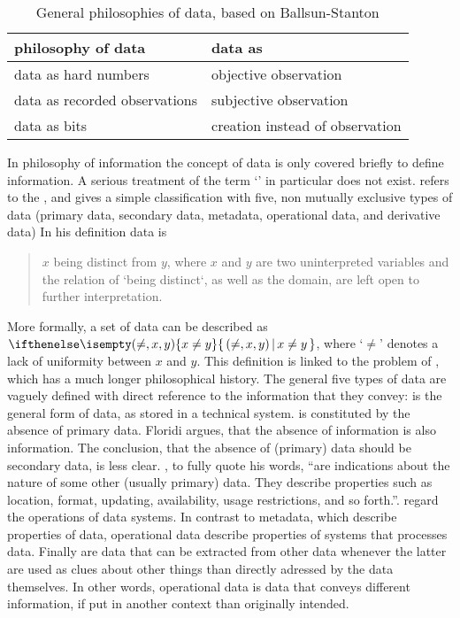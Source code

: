 \begin{table}
\centering
\begin{tabular}{|l|l|}
  \hline
  philosophy of data              & data as \\
  \hline
  data as hard numbers            & objective observation  \\
  data as recorded observations   & subjective observation \\
  data as bits                    & creation instead of observation \\
  \hline
\end{tabular}
\caption{General philosophies of data, based on Ballsun-Stanton}
\label{tab:dataphilosophies}
\end{table}


In philosophy of information the concept of data is only covered briefly to
define information. A serious treatment of the term `' in
particular does not exist. \textcite{Floridi2005,Floridi2010} refers to the
, and gives a simple classification with
five, non mutually exclusive types of data (primary data, secondary data,
metadata, operational data, and derivative data) In his definition data is 

\begin{quotation}%
$x$ being distinct from $y$, where $x$ and $y$ are two uninterpreted variables
and the relation of `being distinct`, as well as the domain, are left open
to further interpretation.\\
\quotationsource \textcite[p. 23]{Floridi2010}
\end{quotation}

\noindent
More formally, a set of data can be described as $\set[(\neq,x,y)]{x \neq y}$,
where `$\neq$' denotes a lack of uniformity between $x$ and $y$. This definition
is linked to the problem of , which has a much longer
philosophical history. The general five types of data are vaguely defined with
direct reference to the information that they convey:  is 
the general form of data, as stored in a technical system.
 is constituted by the absence of primary data. Floridi 
argues, that the absence of information is also information. The conclusion,
that the absence of (primary) data should be secondary data, is less clear.
, to fully quote his words, ``are indications about the nature
of some other (usually primary) data. They describe properties such as location,
format, updating, availability, usage restrictions, and so forth.''.
 regard the operations of data systems. In contrast
to metadata, which describe properties of data, operational data describe
properties of systems that processes data. Finally 
are data that can be extracted from other data whenever the latter are
used as clues about other things than directly adressed by the data 
themselves. In other words, operational data is data that conveys different
information, if put in another context than originally intended.

